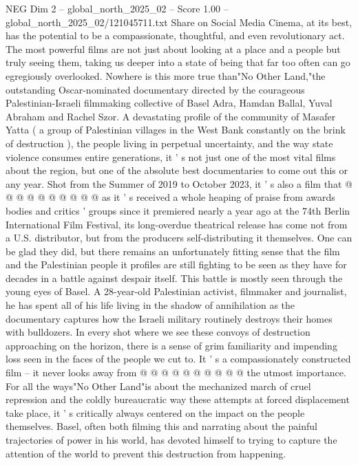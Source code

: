 \begin{textsample}{NEG Dim 2 – global\_north\_2025\_02 – Score 1.00 – global\_north\_2025\_02/121045711.txt}  \label{ex:f2_neg_011}
Share on Social Media Cinema, at its best, has the potential to be a compassionate, thoughtful, and even revolutionary act.
The most powerful films are not just about looking at a place and a people but truly seeing them, taking us deeper into a state of being that far too often can go egregiously overlooked.
Nowhere is this more true than"No Other Land,"the outstanding Oscar-nominated documentary directed by the courageous Palestinian-Israeli filmmaking collective of Basel Adra, Hamdan Ballal, Yuval Abraham and Rachel Szor.
A devastating profile of the community of Masafer Yatta ( a group of Palestinian villages in the West Bank constantly on the brink of destruction ), the people living in perpetual uncertainty, and the way state violence consumes entire generations, it ' s not just one of the most vital films about the region, but one of the absolute best documentaries to come out this or any year.
Shot from the Summer of 2019 to October 2023, it ' s also a film that @ @ @ @ @ @ @ @ @ @ as it ' s received a whole heaping of praise from awards bodies and critics ' groups since it premiered nearly a year ago at the 74th Berlin International Film Festival, its long-overdue theatrical release has come not from a U.S. distributor, but from the producers self-distributing it themselves.
One can be glad they did, but there remains an unfortunately fitting sense that the film and the Palestinian people it profiles are still fighting to be seen as they have for decades in a battle against despair itself.
This battle is mostly seen through the young eyes of Basel.
A 28-year-old Palestinian activist, filmmaker and journalist, he has spent all of his life living in the shadow of annihilation as the documentary captures how the Israeli military routinely destroys their homes with bulldozers.
In every shot where we see these convoys of destruction approaching on the horizon, there is a sense of grim familiarity and impending loss seen in the faces of the people we cut to.
It ' s a compassionately constructed film -- it never looks away from @ @ @ @ @ @ @ @ @ @ the utmost importance.
For all the ways"No Other Land"is about the mechanized march of cruel repression and the coldly bureaucratic way these attempts at forced displacement take place, it ' s critically always centered on the impact on the people themselves.
Basel, often both filming this and narrating about the painful trajectories of power in his world, has devoted himself to trying to capture the attention of the world to prevent this destruction from happening.

\end{textsample}
